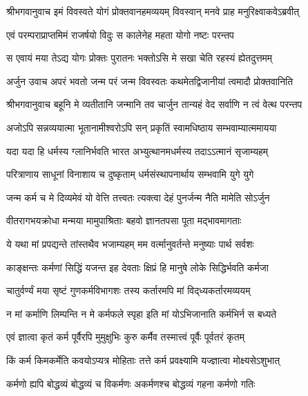 {श्रीभगवानुवाच}
\twolineshloka
{इमं विवस्वते योगं प्रोक्तवानहमव्ययम्}
{विवस्वान् मनवे प्राह मनुरिक्ष्वाकवेऽब्रवीत्}%

\twolineshloka
{एवं परम्पराप्राप्तमिमं राजर्षयो विदुः}
{स कालेनेह महता योगो नष्टः परन्तप}%

\twolineshloka
{स एवायं मया तेऽद्य योगः प्रोक्तः पुरातनः}
{भक्तोऽसि मे सखा चेति रहस्यं ह्येतदुत्तमम्}%

{अर्जुन उवाच}
\twolineshloka
{अपरं भवतो जन्म परं जन्म विवस्वतः}
{कथमेतद्विजानीयां त्वमादौ प्रोक्तवानिति}%

{श्रीभगवानुवाच}
\twolineshloka
{बहूनि मे व्यतीतानि जन्मानि तव चार्जुन}
{तान्यहं वेद सर्वाणि न त्वं वेत्थ परन्तप}%

\twolineshloka
{अजोऽपि सन्नव्ययात्मा भूतानामीश्वरोऽपि सन्}
{प्रकृतिं स्वामधिष्ठाय सम्भवाम्यात्ममायया}%

\twolineshloka
{यदा यदा हि धर्मस्य ग्लानिर्भवति भारत}
{अभ्युत्थानमधर्मस्य तदाऽऽत्मानं सृजाम्यहम्}%

\twolineshloka
{परित्राणाय साधूनां विनाशाय च दुष्कृताम्}
{धर्मसंस्थापनार्थाय सम्भवामि युगे युगे}%

\twolineshloka
{जन्म कर्म च मे दिव्यमेवं यो वेत्ति तत्त्वतः}
{त्यक्त्वा देहं पुनर्जन्म नैति मामेति सोऽर्जुन}%

\twolineshloka
{वीतरागभयक्रोधा मन्मया मामुपाश्रिताः}
{बहवो ज्ञानतपसा पूता मद्भावमागताः}%

\twolineshloka
{ये यथा मां प्रपद्यन्ते तांस्तथैव भजाम्यहम्}
{मम वर्त्मानुवर्तन्ते मनुष्याः पार्थ सर्वशः}%

\twolineshloka
{काङ्क्षन्तः कर्मणां सिद्धिं यजन्त इह देवताः}
{क्षिप्रं हि मानुषे लोके सिद्धिर्भवति कर्मजा}%

\twolineshloka
{चातुर्वर्ण्यं मया सृष्टं गुणकर्मविभागशः}
{तस्य कर्तारमपि मां विद्‌ध्यकर्तारमव्ययम्}%

\twolineshloka
{न मां कर्माणि लिम्पन्ति न मे कर्मफले स्पृहा}
{इति मां योऽभिजानाति कर्मभिर्न स बध्यते}%

\twolineshloka
{एवं ज्ञात्वा कृतं कर्म पूर्वैरपि मुमुक्षुभिः}
{कुरु कर्मैव तस्मात्त्वं पूर्वैः पूर्वतरं कृतम्}%

\twolineshloka
{किं कर्म किमकर्मेति कवयोऽप्यत्र मोहिताः}
{तत्ते कर्म प्रवक्ष्यामि यज्ज्ञात्वा मोक्ष्यसेऽशुभात्}%

\twolineshloka
{कर्मणो ह्यपि बोद्धव्यं बोद्धव्यं च विकर्मणः}
{अकर्मणश्च बोद्धव्यं गहना कर्मणो गतिः}%

